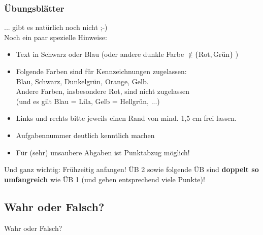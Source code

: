 
\newcommand{\mydate}{11.11.2016}

\newcommand{\handout}{}




\graphicspath{{../figures/}}



\begin{frame}
	\frametitle{Übungsblätter}
	\pause
	... gibt es natürlich noch nicht ;-) \\[1em]
	\pause
	Noch ein paar spezielle Hinweise:
	\begin{itemize}
		\item Text in Schwarz oder Blau (oder andere dunkle Farbe $\notin \{\text{Rot}, \text{Grün}\}$ )
		\item Folgende Farben sind für Kennzeichnungen zugelassen:\\
		Blau, Schwarz, Dunkelgrün, Orange, Gelb.\\
		Andere Farben, insbesondere Rot, sind nicht zugelassen \\
		(und es gilt Blau = Lila, Gelb = Hellgrün, ...)
		\item Links und rechts bitte jeweils einen Rand von mind. 1,5 cm frei lassen.
		\item Aufgabennummer deutlich kenntlich machen
		\item Für (sehr) unsaubere Abgaben ist Punktabzug möglich!
	\end{itemize}
	
	Und ganz wichtig: Frühzeitig anfangen! ÜB 2 sowie folgende ÜB sind \textbf{doppelt so umfangreich} wie ÜB 1 (und geben entsprechend viele Punkte)!
\end{frame}

\framePrevEpisode

\subsection{Wahr oder Falsch?}
\begin{frame}
	\begin{block}{Wahr oder Falsch?}
		\begin{itemize}
		\end{itemize}
	\end{block}
\end{frame}

